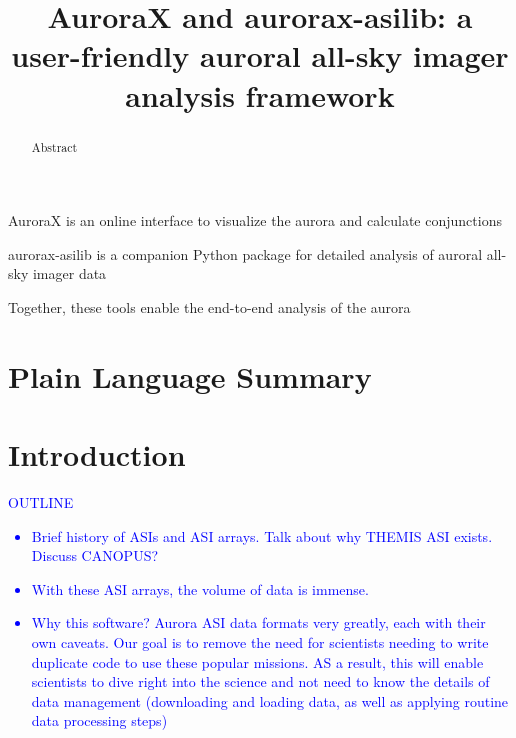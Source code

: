 \documentclass[draft]{agujournal2019}
\begin{document}
\title{AuroraX and aurorax-asilib: a user-friendly auroral all-sky imager analysis framework}





\begin{keypoints}
\item AuroraX is an online interface to visualize the aurora and calculate conjunctions
\item aurorax-asilib is a companion Python package for detailed analysis of auroral all-sky imager data 
\item Together, these tools enable the end-to-end analysis of the aurora
\end{keypoints}


\begin{abstract}
Abstract
\end{abstract}


\section*{Plain Language Summary}
\noindent


\section{Introduction}\label{intro}
\textcolor{blue}{
      OUTLINE
      \begin{itemize}
            \item Brief history of ASIs and ASI arrays. Talk about why THEMIS ASI exists. Discuss CANOPUS?
            \item With these ASI arrays, the volume of data is immense.
            \item Why this software? Aurora ASI data formats very greatly, each with their own caveats. Our goal is to remove the need for scientists needing to write duplicate code to use these popular missions. AS a result, this will enable scientists to dive right into the science and not need to know the details of data management (downloading and loading data, as well as applying routine data processing steps)   
      \end{itemize}
}
\end{document}
